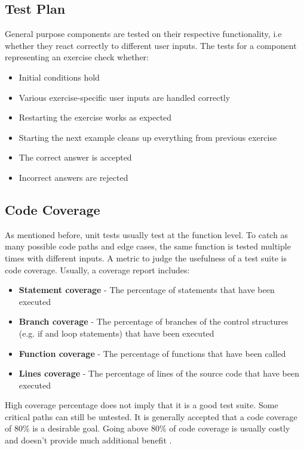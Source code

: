 \subsection*{Test Plan}

General purpose components are tested on their respective functionality, i.e whether they react correctly to different user inputs. The tests for a component representing an exercise check whether:

\begin{itemize}
    \item Initial conditions hold
    \item Various exercise-specific user inputs are handled correctly
    \item Restarting the exercise works as expected
    \item Starting the next example cleans up everything from previous exercise
    \item The correct answer is accepted
    \item Incorrect answers are rejected
\end{itemize}

\subsection*{Code Coverage}
As mentioned before, unit tests usually test at the function level. To catch as many possible code paths and edge cases, the same function is tested multiple times with different inputs. 
A metric to judge the usefulness of a test suite is code coverage. Usually, a coverage report includes:

\begin{itemize}
    \item \textbf{Statement coverage} - The percentage of statements that have been executed 
    \item \textbf{Branch coverage} - The percentage of branches of the control structures (e.g. if and loop statements) that have been executed
    \item \textbf{Function coverage} - The percentage of functions that have been called
    \item \textbf{Lines coverage} - The percentage of lines of the source code that have been executed
\end{itemize}

High coverage percentage does not imply that it is a good test suite. Some critical paths can still be untested. It is generally accepted that a code coverage of 80\% is a desirable goal. Going above 80\% of code coverage is usually costly and doesn't provide much additional benefit \cite{CodeCoverage}.

